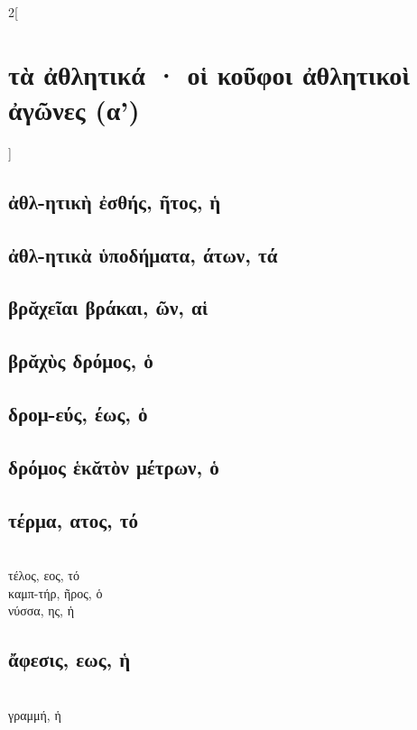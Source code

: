 \documentclass{book}
\begin{document}
\begin{multicols}{2}[\section{τὰ ἀθλητικά · οἱ κοῦφοι ἀθλητικοὶ ἀγῶνες (α')}] %
{\renewcommand \thesubsection {\thesection} }
\subsection{ἀθλ-ητικὴ ἐσθής, ῆτος, ἡ}
\subsection{ἀθλ-ητικὰ ὑποδήματα, άτων, τά}
\subsection{βρᾰχεῖαι βράκαι, ῶν, αἱ}
\subsection{βρᾰχὺς δρόμος, ὁ}
\subsection{δρομ-εύς, έως, ὁ}
\subsection{δρόμος ἑκᾰτὸν μέτρων, ὁ}
\subsection{τέρμα, ατος, τό} %
 ~\\
τέλος, εος, τό  ~\\
καμπ-τήρ, ῆρος, ὁ  ~\\
νύσσα, ης, ἡ 
\subsection{ἄφεσις, εως, ἡ} 
 ~\\
γραμμή, ἡ 

\end{multicols}
\end{document}
